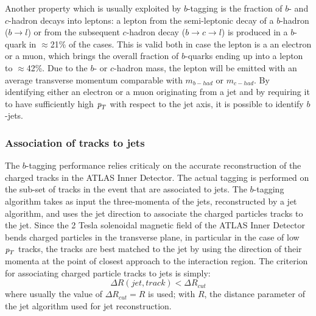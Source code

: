 Another property which is usually exploited by $b$-tagging is the fraction of $b$- and $c$-hadron decays into leptons: a lepton from the semi-leptonic decay of a $b$-hadron ($b \rightarrow l$) or from the subsequent $c$-hadron decay ($b \rightarrow c \rightarrow l$) is produced in a $b$-quark in $\approx$21\% of the cases. This is valid both in case the lepton is a an electron or a muon, which brings the overall fraction of $b$-quarks ending up into a lepton to $\approx$42\%. Due to the $b$- or $c$-hadron mass, the lepton will be emitted with an average transverse momentum comparable with $m_{b-had}$ or $m_{c-had}$. By identifying either an electron or a muon originating from a jet and by requiring it to have sufficiently high ${\emph{p}_{T}}$ with respect to the jet axis, it is possible to identify $b$-jets.



\subsubsection{Association of tracks to jets}

The $b$-tagging performance relies criticaly on the accurate reconstruction of the charged tracks in the ATLAS Inner Detector.  The actual tagging is performed on the sub-set of tracks in the event that are associated to jets.  The $b$-tagging algorithm takes as input the three-momenta of the jets, reconstructed by a jet algorithm, and uses the jet direction to associate the charged particles tracks to the jet. Since the 2 Tesla solenoidal magnetic field of the ATLAS Inner Detector bends charged particles in the transverse plane, in particular in the case of low ${\emph{p}_{T}}$ tracks, the tracks are best matched to the jet by using the direction of their momenta at the point of closest approach to the interaction region.  The criterion for associating charged particle tracks to jets is simply:
%
\begin{equation}
\Delta R(jet, track) < \Delta R_{cut}
\end{equation}
%
where usually the value of $\Delta R_{cut} = R$ is used; with $R$, the distance parameter of the jet algorithm used for jet reconstruction.

